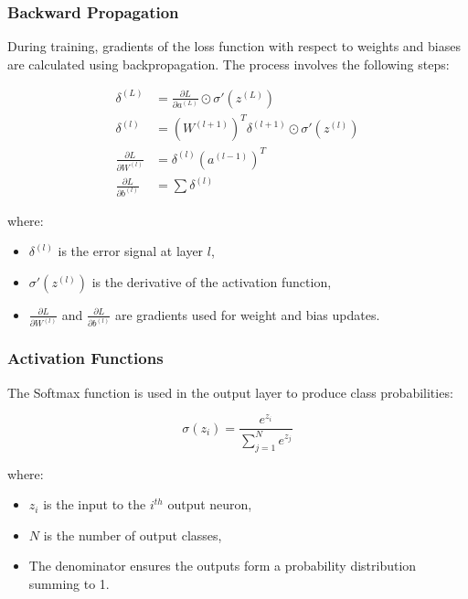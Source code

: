 \subsubsection{Backward Propagation}

During training, gradients of the loss function with respect to weights and biases are calculated using backpropagation. The process involves the following steps:

\begin{align}
	\delta^{(L)} &= \frac{\partial L}{\partial a^{(L)}} \odot \sigma'(z^{(L)}) \\
	\delta^{(l)} &= \left(W^{(l+1)}\right)^T \delta^{(l+1)} \odot \sigma'(z^{(l)}) \\
	\frac{\partial L}{\partial W^{(l)}} &= \delta^{(l)} \left(a^{(l-1)}\right)^T \\
	\frac{\partial L}{\partial b^{(l)}} &= \sum \delta^{(l)}
\end{align}

\noindent where:
\begin{itemize}
	\item \( \delta^{(l)} \) is the error signal at layer \( l \),
	\item \( \sigma'(z^{(l)}) \) is the derivative of the activation function,
	\item \( \frac{\partial L}{\partial W^{(l)}} \) and \( \frac{\partial L}{\partial b^{(l)}} \) are gradients used for weight and bias updates.
\end{itemize}

\subsubsection{Activation Functions}

The Softmax function is used in the output layer to produce class probabilities:

\begin{equation}
	\sigma(z_i) = \frac{e^{z_i}}{\sum_{j=1}^{N} e^{z_j}}
\end{equation}

\noindent where:
\begin{itemize}
	\item \( z_i \) is the input to the \( i^{th} \) output neuron,
	\item \( N \) is the number of output classes,
	\item The denominator ensures the outputs form a probability distribution summing to 1.
\end{itemize}

